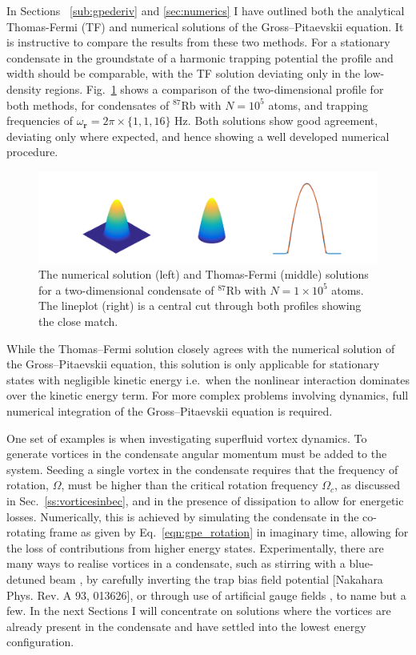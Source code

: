 In Sections ~\ref{sub:gpederiv} and \ref{sec:numerics} I have outlined both the analytical Thomas-Fermi (TF) and numerical solutions of the Gross--Pitaevskii equation. It is instructive to compare the results from these two methods. For a stationary condensate in the groundstate of a harmonic trapping potential the profile and width should be comparable, with the TF solution deviating only in the low-density regions. Fig.~\ref{fig:gpe_tf_3} shows a comparison of the two-dimensional profile for both methods, for condensates of $^{87}$Rb with $N=10^{5}$ atoms, and trapping frequencies of $\omega_{\mathbf{r}}=2\pi\times\{1,1,16 \}$ Hz. Both solutions show good agreement, deviating only where expected, and hence showing a well developed numerical procedure.
\begin{figure}\centering
    \includegraphics[width=\textwidth,trim=0ex 0ex 0ex 0ex]{Images/ch4_vtx/gpe_tf_3.pdf}
    \caption{The numerical solution (left) and Thomas-Fermi (middle) solutions for a two-dimensional condensate of $^{87}$Rb with $N=1\times 10^5$ atoms. The lineplot (right) is a central cut through both profiles showing the close match.}\label{fig:gpe_tf_3}
\end{figure}

While the Thomas--Fermi solution closely agrees with the numerical solution of the Gross--Pitaevskii equation, this solution is only applicable for stationary states with negligible kinetic energy i.e.~when the nonlinear interaction dominates over the kinetic energy term. For more complex problems involving dynamics, full numerical integration of the Gross--Pitaevskii equation is required.

One set of examples is when investigating superfluid vortex dynamics. To generate vortices in the condensate angular momentum must be added to the system. Seeding a single vortex in the condensate requires that the frequency of rotation, $\Omega$, must be higher than the critical rotation frequency $\Omega_c$, as discussed in Sec.~\ref{ss:vorticesinbec}, and in the presence of dissipation to allow for energetic losses. Numerically, this is achieved by simulating the condensate in the co-rotating frame as given by Eq.~\ref{eqn:gpe_rotation} in imaginary time, allowing for the loss of contributions from higher energy states. Experimentally, there are many ways to realise vortices in a condensate, such as stirring with a blue-detuned beam \cite{Vtx:Raman_prl_2001}, by carefully inverting the trap bias field potential \cite{Vtx:Kawaguchi_pra_2004}[Nakahara Phys. Rev. A 93, 013626], or through use of artificial gauge fields \cite{AO:Dalibard_rmp_2011}, to name but a few. In the next Sections I will concentrate on solutions where the vortices are already present in the condensate and have settled into the lowest energy configuration.



